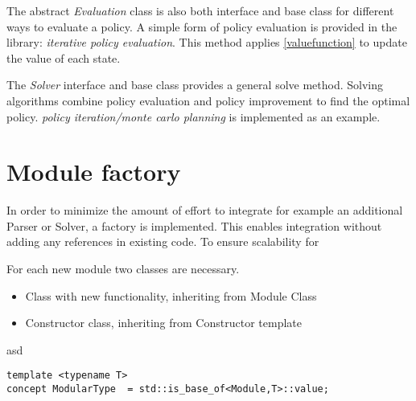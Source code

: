 The abstract \emph{Evaluation} class is also both interface and base class for different ways to evaluate a policy. A simple form of policy evaluation is provided in the library: \emph{iterative policy evaluation}. This method applies \autoref{valuefunction} to update the value of each state. 

The \emph{Solver} interface and base class provides a general solve method. Solving algorithms combine policy evaluation and policy improvement to find the optimal policy. \emph{policy iteration/monte carlo planning} is implemented as an example.

\section{Module factory}
\label{integration}

In order to minimize the amount of effort to integrate for example an additional Parser or Solver, a factory is implemented. This enables integration without adding any references in existing code. To ensure scalability for 

For each new module two classes are necessary.


%

\begin{itemize}
	\item Class with new functionality, inheriting from Module Class
	\item Constructor class, inheriting from Constructor template
\end{itemize}


asd
\begin{lstlisting}
template <typename T>
concept ModularType  = std::is_base_of<Module,T>::value;
\end{lstlisting}

